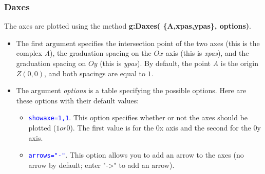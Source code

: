 \subsubsection{Daxes}
\def\opt#1{\textcolor{blue}{\texttt{#1}}}%
The axes are plotted using the method \textbf{g:Daxes( \{A,xpas,ypas\}, options)}.
\begin{itemize}
    \item The first argument specifies the intersection point of the two axes (this is the complex \emph{A}), the graduation spacing on the $Ox$ axis (this is \emph{xpas}), and the graduation spacing on $Oy$ (this is \emph{ypas}). By default, the point \emph{A} is the origin $Z(0,0)$, and both spacings are equal to $1$.
    \item The argument \emph{options} is a table specifying the possible options. Here are these options with their default values:

\begin{itemize}
    \item \opt{showaxe={1,1}}. This option specifies whether or not the axes should be plotted ($1 or $0). The first value is for the 0x axis and the second for the 0y axis.

    \item \opt{arrows="-"}. This option allows you to add an arrow to the axes (no arrow by default; enter "->" to add an arrow).


\end{itemize}
\end{itemize}
